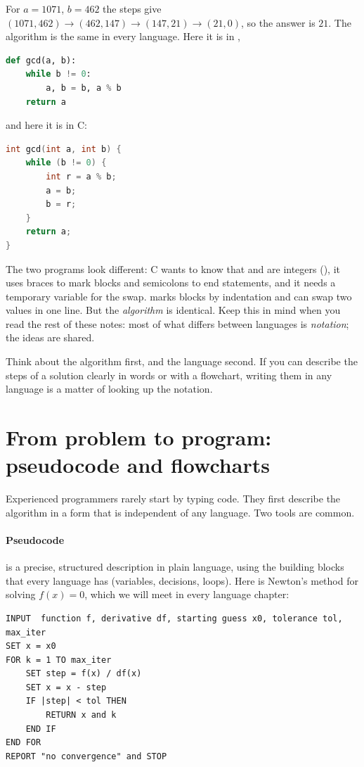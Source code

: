 For $a = 1071$, $b = 462$ the steps give $(1071, 462) \to (462, 147) \to (147, 21)
\to (21, 0)$, so the answer is $21$. The algorithm is the same in every language. Here
it is in \py,
\begin{lstlisting}[language=Python]
def gcd(a, b):
    while b != 0:
        a, b = b, a % b
    return a
\end{lstlisting}
and here it is in C:
\begin{lstlisting}[language=C]
int gcd(int a, int b) {
    while (b != 0) {
        int r = a % b;
        a = b;
        b = r;
    }
    return a;
}
\end{lstlisting}
The two programs look different: C wants to know that  and  are
integers (), it uses braces \code{\{ \}} to mark blocks and semicolons to end
statements, and it needs a temporary variable  for the swap. \py marks blocks
by indentation and can swap two values in one line. But the \emph{algorithm} is
identical. Keep this in mind when you read the rest of these notes: most of what
differs between languages is \emph{notation}; the ideas are shared.

\begin{keyidea}
Think about the algorithm first, and the language second. If you can describe the steps
of a solution clearly in words or with a flowchart, writing them in any language is a
matter of looking up the notation.
\end{keyidea}

\section{From problem to program: pseudocode and flowcharts}

Experienced programmers rarely start by typing code. They first describe the algorithm in
a form that is independent of any language. Two tools are common.

\paragraph{Pseudocode} is a precise, structured description in plain language, using the
building blocks that every language has (variables, decisions, loops). Here is Newton's
method for solving $f(x) = 0$, which we will meet in every language chapter:
\begin{lstlisting}[language={},basicstyle=\ttfamily\small,keywordstyle={},
  morekeywords={INPUT,OUTPUT,SET,FOR,TO,IF,THEN,RETURN,END,STOP,REPORT}]
INPUT  function f, derivative df, starting guess x0, tolerance tol, max_iter
SET x = x0
FOR k = 1 TO max_iter
    SET step = f(x) / df(x)
    SET x = x - step
    IF |step| < tol THEN
        RETURN x and k
    END IF
END FOR
REPORT "no convergence" and STOP
\end{lstlisting}

